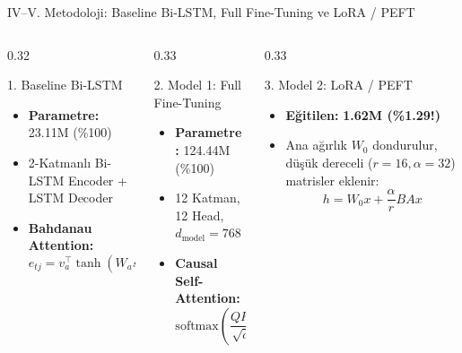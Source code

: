\documentclass[aspectratio=169,10pt]{beamer}
\begin{document}
\begin{frame}{IV--V. Metodoloji: Baseline Bi-LSTM, Full Fine-Tuning ve LoRA / PEFT}
    \begin{columns}[T]
        \begin{column}{0.32\textwidth}
            \begin{block}{1. Baseline Bi-LSTM}
                \begin{itemize}
                    \item \textbf{Parametre:} 23.11M (\%100)
                    \item 2-Katmanlı Bi-LSTM Encoder + LSTM Decoder
                    \item \textbf{Bahdanau Attention:}
                    \[
                        e_{tj} = v_a^\top \tanh(W_a s_{t-1} + U_a h_j)
                    \]
                \end{itemize}
            \end{block}
        \end{column}
        \begin{column}{0.33\textwidth}
            \begin{block}{2. Model 1: Full Fine-Tuning}
                \begin{itemize}
                    \item \textbf{Parametre:} 124.44M (\%100)
                    \item 12 Katman, 12 Head, $d_{\text{model}}=768$
                    \item \textbf{Causal Self-Attention:}
                    \[
                        \text{softmax}\!\left(\frac{QK^\top}{\sqrt{d_k}} + M\right)\!V
                    \]
                \end{itemize}
            \end{block}
        \end{column}
        \begin{column}{0.33\textwidth}
            \begin{block}{3. Model 2: LoRA / PEFT}
                \begin{itemize}
                    \item \textbf{Eğitilen:} \textbf{1.62M (\%1.29!)}
                    \item Ana ağırlık $W_0$ dondurulur, düşük dereceli ($r=16, \alpha=32$) matrisler eklenir:
                    \[
                        h = W_0 x + \frac{\alpha}{r} B A x
                    \]
                \end{itemize}
            \end{block}
        \end{column}
    \end{columns}
\end{frame}
\end{document}
